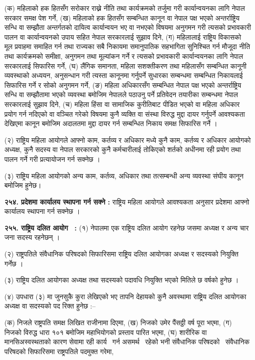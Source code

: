 (क) महिलाको हक हितसँग सरोकार राख्ने नीति तथा कार्यक्रमको तर्जुमा गरी कार्यान्वयनका लागि नेपाल सरकार समक्ष पेश गर्ने,
(ख) महिलाको हक हितसँग सम्बन्धित कानून वा नेपाल पक्ष भएको अन्तर्राष्ट्रिय सन्धि वा सम्झौता अन्तर्गतको दायित्व कार्यान्वयन भए वा नभएको विषयमा अनुगमन गरी त्यसको प्रभावकारी पालन वा कार्यान्वयनको उपाय सहित नेपाल सरकारलाई सुझाव दिने,
(ग) महिलालाई राष्ट्रिय विकासको मूल प्रवाहमा समाहित गर्न तथा राज्यका सबै निकायमा समानुपातिक सहभागिता सुनिश्चित गर्न मौजूदा नीति तथा कार्यक्रमको समीक्षा, अनुगमन तथा मूल्यांकन गर्ने र त्यसको प्रभावकारी कार्यान्वयनका लागि नेपाल सरकारलाई सिफारिस गर्ने,
(घ) लैंगिक समानता, महिला सशक्तीकरण तथा महिलासँग सम्बन्धित कानूनी व्यवस्थाको अध्ययन, अनुसन्धान गरी त्यस्ता कानूनमा गर्नुपर्ने सुधारका सम्बन्धमा सम्बन्धित निकायलाई सिफारिस गर्ने र सोको अनुगमन गर्ने,
(ङ) महिला अधिकारसँग सम्बन्धित नेपाल पक्ष भएको अन्तर्राष्ट्रिय सन्धि वा सम्झौतामा भएको व्यवस्था बमोजिम नेपालले पठाउनु पर्ने प्रतिवेदन तयारीका सम्बन्धमा नेपाल सरकारलाई सुझाव दिने,
(च) महिला हिंसा वा सामाजिक कुरीतिबाट पीडित भएको वा महिला अधिकार प्रयोग गर्न नदिएको वा वञ्चित गरेको विषयमा कुनै व्यक्ति वा संस्था विरुद्ध मुद्दा दायर गर्नुपर्ने आवश्यकता देखिएमा कानून बमोजिम अदालतमा मुद्दा दायर गर्न सम्बन्धित निकाय समक्ष सिफारिस गर्ने ।

(२) राष्ट्रिय महिला आयोगले आफ्नो काम, कर्तव्य र अधिकार मध्ये कुनै काम, कर्तव्य र अधिकार आयोगको अध्यक्ष, कुनै सदस्य वा नेपाल सरकारको कुनै कर्मचारीलाई तोकिएको शर्तको अधीनमा रही प्रयोग तथा पालन गर्ने गरी प्रत्यायोजन गर्न सक्नेछ ।

(३) राष्ट्रिय महिला आयोगको अन्य काम, कर्तव्य, अधिकार तथा तत्सम्बन्धी अन्य व्यवस्था संघीय कानून बमोजिम हुनेछ।

\textbf{२५४. प्रदेशमा कार्यालय स्थापना गर्न सक्ने :} राष्ट्रिय महिला आयोगले आवश्यकता अनुसार प्रदेशमा आफ्नो कार्यालय स्थापना गर्न सक्नेछ ।

\textbf{२५५. राष्ट्रिय दलित आयोग  :} (१) नेपालमा एक राष्ट्रिय दलित आयोग रहनेछ जसमा अध्यक्ष र अन्य चार जना सदस्य रहनेछन् ।

(२) राष्ट्रपतिले संवैधानिक परिषदको सिफारिसमा राष्ट्रिय दलित आयोगका अध्यक्ष र सदस्यको नियुक्ति गर्नेछ ।

(३) राष्ट्रिय दलित आयोगका अध्यक्ष तथा सदस्यको पदावधि नियुक्ति भएको मितिले छ वर्षको हुनेछ ।

(४) उपधारा (३) मा जुनसुकै कुरा लेखिएको भए तापनि देहायको कुनै अवस्थामा राष्ट्रिय दलित आयोगका अध्यक्ष वा सदस्यको पद रिक्त हुनेछ :–

(क) निजले राष्ट्रपति समक्ष लिखित राजीनामा दिएमा,
(ख) निजको उमेर पैंसठ्ठी वर्ष पूरा भएमा,
(ग) निजको विरुद्ध धारा १०१ बमोजिम महाभियोगको प्रस्ताव पारित भएमा,
(घ) शारीरिक वा मानसिअस्वस्थताको कारण सेवामा रही कार्य  गर्न असमर्थ  रहेको भनी संवैधानिक परिषदको  संवैधानिक परिषदको सिफारिसमा राष्ट्रपतिले पदमुक्त गरेमा,

